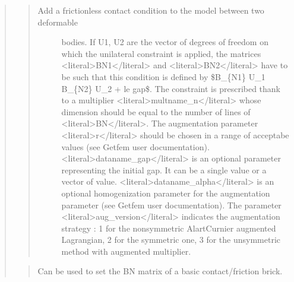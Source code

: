 \documentclass[a4paper,11pt,english]{sphinxmanual}
\begin{document}
\begin{quote}
\sphinxAtStartPar
{}
\begin{quote}
\begin{description}
\item[{Add a frictionless contact condition to the model between two deformable}] \leavevmode
\sphinxAtStartPar
bodies. If U1, U2 are the vector
of degrees of freedom on which the unilateral constraint is applied,
the matrices \textless{}literal\textgreater{}BN1\textless{}/literal\textgreater{} and \textless{}literal\textgreater{}BN2\textless{}/literal\textgreater{} have to be such that this condition
is defined by
\$B\_\{N1\} U\_1 B\_\{N2\} U\_2 + le gap\$. The constraint is prescribed thank
to a multiplier
\textless{}literal\textgreater{}multname\_n\textless{}/literal\textgreater{} whose dimension should be equal to the number of lines of
\textless{}literal\textgreater{}BN\textless{}/literal\textgreater{}. The augmentation parameter \textless{}literal\textgreater{}r\textless{}/literal\textgreater{} should be chosen in a range of
acceptabe values (see Getfem user documentation). \textless{}literal\textgreater{}dataname\_gap\textless{}/literal\textgreater{} is an
optional parameter representing the initial gap. It can be a single value
or a vector of value. \textless{}literal\textgreater{}dataname\_alpha\textless{}/literal\textgreater{} is an optional homogenization
parameter for the augmentation parameter
(see Getfem user documentation). The parameter \textless{}literal\textgreater{}aug\_version\textless{}/literal\textgreater{} indicates
the augmentation strategy : 1 for the non\sphinxhyphen{}symmetric Alart\sphinxhyphen{}Curnier
augmented Lagrangian, 2 for the symmetric one, 3 for the unsymmetric
method with augmented multiplier.

\end{description}
\end{quote}

\sphinxAtStartPar
{}
\begin{quote}

\sphinxAtStartPar
Can be used to set the BN matrix of a basic contact/friction brick.
\end{quote}


\end{quote}
\end{document}
